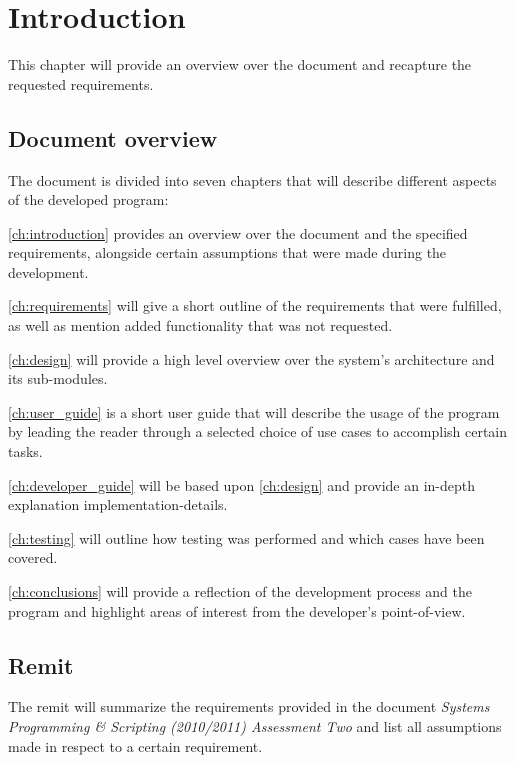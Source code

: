 \chapter{Introduction}\label{ch:introduction}

This chapter will provide an overview over the document and recapture the requested requirements.

\section{Document overview}
\label{sec:document_overview}

The document is divided into seven chapters that will describe different aspects of the developed program:

\autoref{ch:introduction} provides an overview over the document and the specified requirements, alongside certain assumptions that were made during the development.

\autoref{ch:requirements} will give a short outline of the requirements that were fulfilled, as well as mention added functionality that was not requested.

\autoref{ch:design} will provide a high level overview over the system's architecture and its sub-modules.

\autoref{ch:user_guide} is a short user guide that will describe the usage of the program by leading the reader through a selected choice of use cases to accomplish certain tasks.

\autoref{ch:developer_guide} will be based upon \autoref{ch:design} and provide an in-depth explanation implementation-details.

\autoref{ch:testing} will outline how testing was performed and which cases have been covered.

\autoref{ch:conclusions} will provide a reflection of the development process and the program and highlight areas of interest from the developer's point-of-view.

\section{Remit}
\label{sec:remit}

The remit will summarize the requirements provided in the document \textit{Systems Programming \& Scripting (2010/2011) Assessment Two} and list all assumptions made in respect to a certain requirement.

